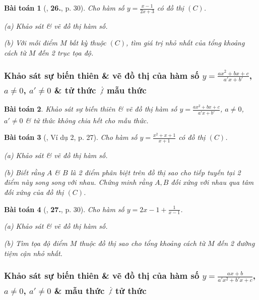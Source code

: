 \documentclass[12pt]{article}
\numberwithin{equation}{section}
\newtheorem{baitoan}{Bài toán}[section]
\begin{document}
\begin{baitoan}[\cite{TL_chuyen_Toan_Giai_Tich_12}, \textbf{26.}, p. 30]
	Cho hàm số $y = \frac{x - 1}{2x + 3}$ có đồ thị $(C)$.
	\begin{enumerate*}
		\item[(a)] Khảo sát \& vẽ đồ thị hàm số.
		\item[(b)] Với mỗi điểm $M$ bất kỳ thuộc $(C)$, tìm giá trị nhỏ nhất của tổng khoảng cách từ $M$ đến 2 trục tọa độ.
	\end{enumerate*}
\end{baitoan}

\subsubsection{Khảo sát sự biến thiên \& vẽ đồ thị của hàm số $y = \frac{ax^2 + bx + c}{a'x + b'}$, $a\ne 0$, $a'\ne 0$ \& tử thức $\not\vdots$ mẫu thức}

\begin{baitoan}
	Khảo sát sự biến thiên \& vẽ đồ thị hàm số $y = \frac{ax^2 + bx + c}{a'x + b'}$, $a\ne 0$, $a'\ne 0$ \& tử thức không chia hết cho mẫu thức.
\end{baitoan}

\begin{baitoan}[\cite{TL_chuyen_Toan_Giai_Tich_12}, Ví dụ 2, p. 27]
	Cho hàm số $y = \frac{x^2 + x + 1}{x + 1}$ có đồ thị $(C)$.
	\begin{enumerate*}
		\item[(a)] Khảo sát \& vẽ đồ thị hàm số.
		\item[(b)] Biết rằng $A$ \& $B$ là 2 điểm phân biệt trên đồ thị sao cho tiếp tuyến tại 2 điểm này song song với nhau. Chứng minh rằng $A,B$ đối xứng với nhau qua tâm đối xứng của đồ thị $(C)$.
	\end{enumerate*}
\end{baitoan}

\begin{baitoan}[\cite{TL_chuyen_Toan_Giai_Tich_12}, \textbf{27.}, p. 30]
	Cho hàm số $y = 2x - 1 + \frac{1}{x - 1}$.
	\begin{enumerate*}
		\item[(a)] Khảo sát \& vẽ đồ thị hàm số.
		\item[(b)] Tìm tọa độ điểm $M$ thuộc đồ thị sao cho tổng khoảng cách từ $M$ đến 2 đường tiệm cận nhỏ nhất.
	\end{enumerate*}
\end{baitoan}

\subsubsection{Khảo sát sự biến thiên \& vẽ đồ thị của hàm số $y = \frac{ax + b}{a'x^2 + b'x + c}$, $a\ne 0$, $a'\ne 0$ \& mẫu thức $\not\vdots$ tử thức}
\end{document}
